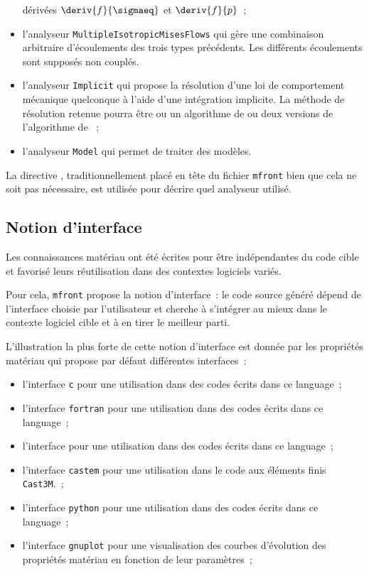 \documentclass[rectoverso,pleiades,pstricks,leqno,anti]{texmf/note_technique_2010}
\makeatletter
\newcommand{\mfront}{\texttt{mfront}}
\newcommand{\castem}{\texttt{Cast3M}}
\newcommand{\mkey}[1]{\index{mkeys}{#1@\symbol{64}#1}{\texttt{@#1}}}
\def\ifmonospace{\ifdim\fontdimen3\font=0pt }
\def\cpp{%
\ifmonospace%
    C++%
\else%
    C\kern-.1667em\raise.30ex\hbox{\smaller{++}}%
\fi%
\spacefactor1000 }
\makeatother
\begin{document}
\begin{itemize}
  dérivées \(\deriv{f}{\sigmaeq}\) et \(\deriv{f}{p}\)~;
  \item l'analyseur \texttt{MultipleIsotropicMisesFlows} qui gère une
  combinaison arbitraire d'écoulements des trois types précédents. Les
  différents écoulements sont supposés non couplés.
  \item l'analyseur \texttt{Implicit} qui propose la résolution d'une
  loi de comportement mécanique quelconque à l'aide d'une intégration
  implicite. La méthode de résolution retenue pourra être ou un
  algorithme de  ou deux versions de l'algorithme de
  ~;
  \item l'analyseur \texttt{Model} qui permet de traiter des modèles.
\end{itemize}

La directive \mkey{Parser}, traditionnellement placé en tête du fichier
\mfront{} bien que cela ne soit pas nécessaire, est utilisée pour
décrire quel analyseur utilisé.

\subsection{Notion d'interface}
\label{sec:mfront:interface}

Les connaissances matériau ont été écrites pour être indépendantes du
code cible et favorisé leurs réutilisation dans des contextes logiciels
variés.

Pour cela, \mfront{} propose la notion d'interface~: le code source
généré dépend de l'interface choisie par l'utilisateur et cherche à
s'intégrer au mieux dans le contexte logiciel cible et à en tirer le
meilleur parti.

L'illustration la plus forte de cette notion d'interface est donnée par
les propriétés matériau qui propose par défaut différentes interfaces~:
\begin{itemize}
  \item l'interface \texttt{c} pour une utilisation dans des codes
  écrits dans ce language~;
  \item l'interface \texttt{fortran} pour une utilisation dans des codes
  écrits dans ce language~;
  \item l'interface \cpp{} pour une utilisation dans des codes
  écrits dans ce language~;
  \item l'interface \texttt{castem} pour une utilisation dans le code
  aux éléments finis \castem{}.~;
  \item l'interface \texttt{python} pour une utilisation dans des codes
  écrits dans ce language~;
  \item l'interface \texttt{gnuplot} pour une visualisation des courbes
  d'évolution des propriétés matériau en fonction de leur paramètres~;
\end{itemize}
\end{document}
